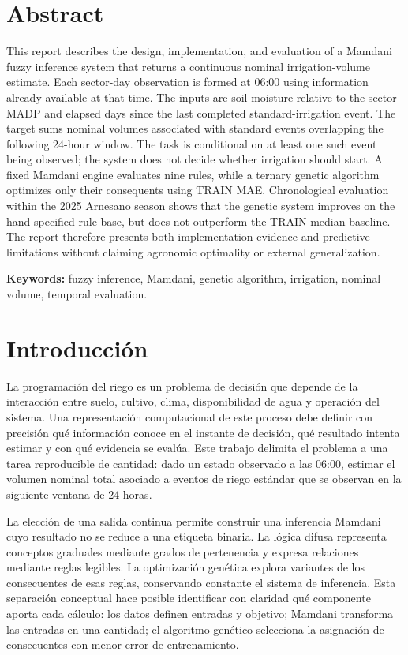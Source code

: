 \documentclass[11pt,letterpaper]{article}
\begin{document}
\section*{Abstract}
This report describes the design, implementation, and evaluation of a Mamdani fuzzy inference system that returns a continuous nominal irrigation-volume estimate. Each sector-day observation is formed at 06:00 using information already available at that time. The inputs are soil moisture relative to the sector MADP and elapsed days since the last completed standard-irrigation event. The target sums nominal volumes associated with standard events overlapping the following 24-hour window. The task is conditional on at least one such event being observed; the system does not decide whether irrigation should start. A fixed Mamdani engine evaluates nine rules, while a ternary genetic algorithm optimizes only their consequents using TRAIN MAE. Chronological evaluation within the 2025 Arnesano season shows that the genetic system improves on the hand-specified rule base, but does not outperform the TRAIN-median baseline. The report therefore presents both implementation evidence and predictive limitations without claiming agronomic optimality or external generalization.

\textbf{Keywords:} fuzzy inference, Mamdani, genetic algorithm, irrigation, nominal volume, temporal evaluation.

\tableofcontents
\clearpage
\listoffigures
\clearpage
\listoftables
\clearpage
{}

\section{Introducción}
La programación del riego es un problema de decisión que depende de la interacción entre suelo, cultivo, clima, disponibilidad de agua y operación del sistema. Una representación computacional de este proceso debe definir con precisión qué información conoce en el instante de decisión, qué resultado intenta estimar y con qué evidencia se evalúa. Este trabajo delimita el problema a una tarea reproducible de cantidad: dado un estado observado a las 06:00, estimar el volumen nominal total asociado a eventos de riego estándar que se observan en la siguiente ventana de 24 horas.

La elección de una salida continua permite construir una inferencia Mamdani cuyo resultado no se reduce a una etiqueta binaria. La lógica difusa representa conceptos graduales mediante grados de pertenencia y expresa relaciones mediante reglas legibles. La optimización genética explora variantes de los consecuentes de esas reglas, conservando constante el sistema de inferencia. Esta separación conceptual hace posible identificar con claridad qué componente aporta cada cálculo: los datos definen entradas y objetivo; Mamdani transforma las entradas en una cantidad; el algoritmo genético selecciona la asignación de consecuentes con menor error de entrenamiento.
\end{document}
